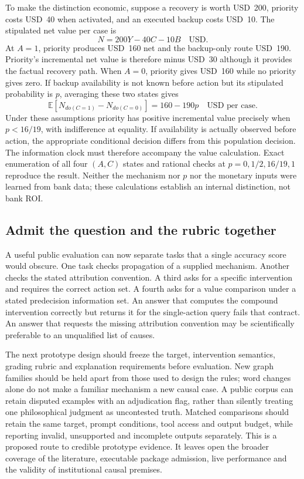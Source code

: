 To make the distinction economic, suppose a recovery is worth USD~200,
priority costs USD~40 when activated, and an executed backup costs USD~10.
The stipulated net value per case is
\begin{equation}
 N=200Y-40C-10B\quad\text{USD}.
 \label{exec18:reasoning-money}
\end{equation}
At $A=1$, priority produces USD~160 net and the backup-only route USD~190.
Priority's incremental net value is therefore minus USD~30 although it
provides the factual recovery path. When $A=0$, priority gives USD~160 while
no priority gives zero. If backup availability is not known before action
but its stipulated probability is $p$, averaging these two states gives
\begin{equation}
 \mathbb{E}[N_{do(C=1)}-N_{do(C=0)}]
 =160-190p\quad\text{USD per case}.
 \label{exec18:reasoning-threshold}
\end{equation}
Under these assumptions priority has positive incremental value precisely
when $p<16/19$, with indifference at equality. If availability is actually
observed before action, the appropriate conditional decision differs from
this population decision. The information clock must therefore accompany
the value calculation. Exact enumeration of all four $(A,C)$ states and
rational checks at $p=0,1/2,16/19,1$ reproduce the result. Neither the
mechanism nor $p$ nor the monetary inputs were learned from bank data; these
calculations establish an internal distinction, not bank ROI.~\citep{exec18_reasoning_reference}

\subsection{Admit the question and the rubric together}
A useful public evaluation can now separate tasks that a single accuracy
score would obscure. One task checks propagation of a supplied mechanism.
Another checks the stated attribution convention. A third asks for a
specific intervention and requires the correct action set. A fourth asks
for a value comparison under a stated predecision information set. An
answer that computes the compound intervention correctly but returns it for
the single-action query fails that contract. An answer that requests the
missing attribution convention may be scientifically preferable to an
unqualified list of causes.

The next prototype design should freeze the target, intervention semantics,
grading rubric and explanation requirements before evaluation. New graph
families should be held apart from those used to design the rules; word
changes alone do not make a familiar mechanism a new causal case. A public
corpus can retain disputed examples with an adjudication flag, rather than
silently treating one philosophical judgment as uncontested truth. Matched
comparisons should retain the same target, prompt conditions, tool access
and output budget, while reporting invalid, unsupported and incomplete
outputs separately. This is a proposed route to credible prototype evidence.
It leaves open the broader coverage of the literature, executable package
admission, live performance and the validity of institutional causal premises.


